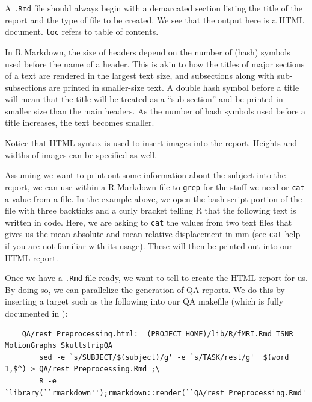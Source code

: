 A \texttt{.Rmd} file should always begin with a demarcated section listing the title of the report and the type of file to be created. We see that the output here is a HTML document. \texttt{toc} refers to table of contents. %

In R Markdown, the size of headers depend on the number of \mypound (hash) symbols used before the name of a header. This is akin to how the titles of major sections of a text are rendered in the largest text size, and subsections along with sub-subsections are printed in smaller-size text. A double hash symbol before a title will mean that the title will be treated as a ``sub-section'' and be printed in smaller size than the main headers. As the number of hash symbols used before a title increases, the text becomes smaller.

Notice that HTML syntax is used to insert images into the report. Heights and widths of images can be specified as well. 

Assuming we want to print out some information about the subject into the report, we can use \bashn{} within a R Markdown file to \texttt{grep} for the stuff we need or \texttt{cat} a value from a file. In the example above, we open the bash script portion of the file with three backticks and a curly bracket telling R that the following text is written in \bashn{} code. Here, we are asking \bashn{} to \texttt{cat} the values from two text files that gives us the mean absolute and mean relative displacement in mm (see \texttt{cat} help if you are not familiar with its usage). These will then be printed out into our HTML report.

Once we have a \texttt{.Rmd} file ready, we want to tell \maken{} to create the HTML report for us. By doing so, we can parallelize the generation of QA reports. We do this by inserting a target such as the following into our QA makefile (which is fully documented in ):

\begin{lstlisting}
	QA/rest_Preprocessing.html:  (PROJECT_HOME)/lib/R/fMRI.Rmd TSNR MotionGraphs SkullstripQA
		sed -e `s/SUBJECT/$(subject)/g' -e `s/TASK/rest/g'  $(word 1,$^) > QA/rest_Preprocessing.Rmd ;\
		R -e `library(``rmarkdown'');rmarkdown::render(``QA/rest_Preprocessing.Rmd'')' 
\end{lstlisting}

